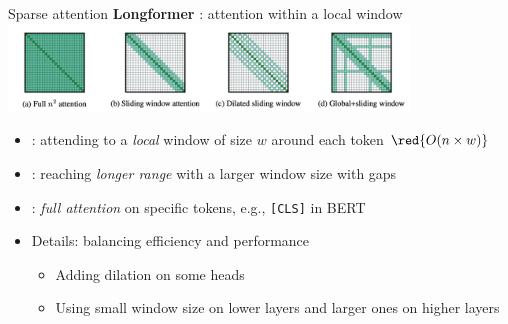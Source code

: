 \documentclass[usenames,dvipsnames,notes,11pt,aspectratio=169,hyperref={colorlinks=true, linkcolor=blue}]{beamer}
\begin{document}
\begin{frame}
    {Sparse attention}
    \textbf{Longformer} : attention within a local window\\[1ex]

        {\includegraphics[width=0.8\textwidth]{figures/longformer}}

    \begin{itemize}
        \item {}: attending to a \textit{local} window of size $w$ around each token $\red{O(n\times w)}$
        \item {}: reaching \textit{longer range} with a larger window size with gaps
        \item {}: \textit{full attention} on specific tokens, e.g., \texttt{[CLS]} in BERT
            \pause
        \item Details: balancing efficiency and performance
            \begin{itemize}
                \item Adding dilation on some heads
                \item Using small window size on lower layers and larger ones on higher layers
            \end{itemize}
    \end{itemize}
\end{frame}
\end{document}
